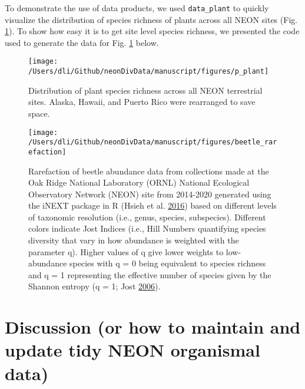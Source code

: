 \documentclass[
  12pt,
]{article}
\begin{document}
To demonstrate the use of data products, we used \texttt{data\_plant} to quickly visualize the distribution of species richness of plants across all NEON sites (Fig. \ref{fig:Fig2Map}). To show how easy it is to get site level species richness, we presented the code used to generate the data for Fig. \ref{fig:Fig2Map} below.



\begin{figure}

{\centering \texttt{[image: /Users/dli/Github/neonDivData/manuscript/figures/p\_plant]} 

}

\caption{Distribution of plant species richness across all NEON terrestrial sites. Alaska, Hawaii, and Puerto Rico were rearranged to save space.}\label{fig:Fig2Map}
\end{figure}



\begin{figure}

{\centering \texttt{[image: /Users/dli/Github/neonDivData/manuscript/figures/beetle\_rarefaction]} 

}

\caption{Rarefaction of beetle abundance data from collections made at the Oak Ridge National Laboratory (ORNL) National Ecological Observatory Network (NEON) site from 2014-2020 generated using the iNEXT package in R (Hsieh et al. \protect\hyperlink{ref-hsieh2016inext}{2016}) based on different levels of taxonomic resolution (i.e., genus, species, subspecies). Different colors indicate Jost Indices (i.e., Hill Numbers quantifying species diversity that vary in how abundance is weighted with the parameter q). Higher values of q give lower weights to low-abundance species with q = 0 being equivalent to species richness and q = 1 representing the effective number of species given by the Shannon entropy (q = 1; Jost \protect\hyperlink{ref-jost2006entropy}{2006}).}\label{fig:Fig3Curve}
\end{figure}

\hypertarget{discussion-or-how-to-maintain-and-update-tidy-neon-organismal-data}{%
\section{Discussion (or how to maintain and update tidy NEON organismal data)}\label{discussion-or-how-to-maintain-and-update-tidy-neon-organismal-data}}
\end{document}
